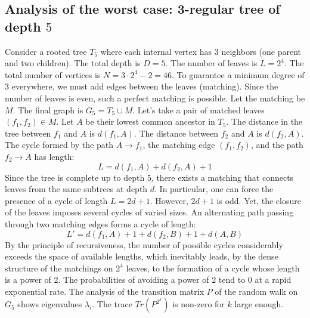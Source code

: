 \documentclass[12pt,a4paper]{article}
\begin{document}
\subsection{Analysis of the worst case: 3-regular tree of depth $5$}
Consider a rooted tree $T_{5}$ where each internal vertex has 3 neighbors (one parent and two children).
The total depth is $D = 5$.
The number of leaves is $L = 2^{4}$.
The total number of vertices is $N = 3 \cdot 2^{4} - 2 = 46$.
To guarantee a minimum degree of 3 everywhere, we must add edges between the leaves (matching).
Since the number of leaves is even, such a perfect matching is possible.
Let the matching be $M$. The final graph is $G_{5} = T_{5} \cup M$.
Let's take a pair of matched leaves $(f_1, f_2) \in M$.
Let $A$ be their lowest common ancestor in $T_{5}$.
The distance in the tree between $f_1$ and $A$ is $d(f_1, A)$.
The distance between $f_2$ and $A$ is $d(f_2, A)$.
The cycle formed by the path $A \to f_1$, the matching edge $(f_1, f_2)$, and the path $f_2 \to A$ has length:
$$ L = d(f_1, A) + d(f_2, A) + 1 $$
Since the tree is complete up to depth $5$, there exists a matching that connects leaves from the same subtrees at depth $d$.
In particular, one can force the presence of a cycle of length $L = 2d + 1$. However, $2d+1$ is odd.
Yet, the closure of the leaves imposes several cycles of varied sizes. An alternating path passing through two matching edges forms a cycle of length:
$$ L' = d(f_1, A) + 1 + d(f_2, B) + 1 + d(A, B) $$
By the principle of recursiveness, the number of possible cycles considerably exceeds the space of available lengths, which inevitably leads, by the dense structure of the matchings on $2^{4}$ leaves, to the formation of a cycle whose length is a power of 2. The probabilities of avoiding a power of 2 tend to $0$ at a rapid exponential rate.
The analysis of the transition matrix $P$ of the random walk on $G_{5}$ shows eigenvalues $\lambda_i$. The trace $Tr(P^{2^k})$ is non-zero for $k$ large enough.
\end{document}
